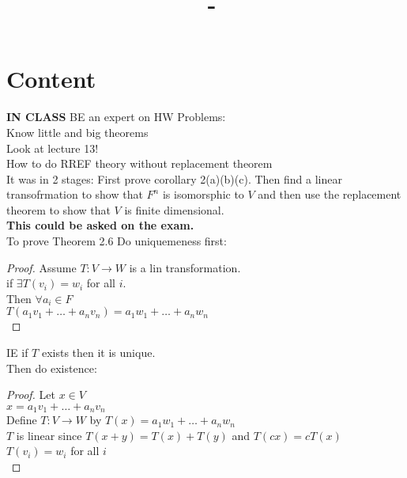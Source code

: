 \documentclass[answers,12pt,addpoints]{exam}
\author{\name}
\title{\course \ - \assignment}
\begin{document}
\maketitle
\tableofcontents

\newpage
\section{Content}
\textbf{IN CLASS}
BE an expert on HW Problems:\\
Know little and big theorems\\



Look at lecture 13!\\
How to do RREF theory without replacement theorem\\
It was in 2 stages: First prove corollary 2(a)(b)(c). Then find a linear transofrmation to show that $F^n$ is isomorsphic to $V$ and then use the replacement theorem to show that $V$ is finite dimensional.\\

\textbf{This could be asked on the exam.}\\

To prove Theorem 2.6 Do uniquemeness first:
\begin{proof}
    Assume $T: V \to W$ is a lin transformation. \\
    if $\exists T(v_i) =w_i$ for all $i$.\\
    Then $\forall a_i \in F$ \\
    $T(a_1v_1 + \dots + a_nv_n) = a_1w_1 + \dots + a_nw_n$\\
\end{proof}
IE if $T$ exists then it is unique.\\
Then do existence:\\
\begin{proof}
    Let $x \in V$\\
    $x = a_1v_1 + \dots + a_nv_n$\\
    Define $T: V \to W$ by $T(x) = a_1w_1 + \dots + a_nw_n$\\
    $T$ is linear since $T(x+y) = T(x) + T(y)$ and $T(cx) = cT(x)$\\
    $T(v_i) = w_i$ for all $i$\\
\end{proof}
\end{document}
